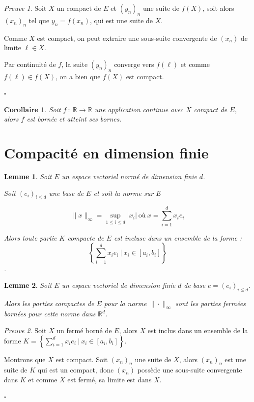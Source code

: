 \documentclass[]{article}
\newtheorem{mylemma}{Lemme}
\newtheorem{mycor}{Corollaire}
\theoremstyle{remark}
\newtheorem{myproof}{Preuve}
\theoremstyle{definition}
\newcommand{\cqfd}{
	\hfill$\square$
}
\newcommand{\funcshort}[3]{
#1 ~ : ~ #2 \longrightarrow #3
}
\begin{document}
\begin{myproof}
	Soit $X$ un compact de $E$ et $(y_n)_n$ une suite de $f(X)$, soit alors $(x_n)_n$ tel que $y_n=f(x_n)$, qui est une suite de $X$.
	
	Comme $X$ est compact, on peut extraire une sous-suite convergente de $(x_n)$ de limite $\ell \in X$.
	
	Par continuité de $f$, la suite $(y_n)_n$ converge vers $f(\ell)$ et comme $f(\ell) \in f(X)$, on a bien que $f(X)$ est compact.
	
	
	\cqfd
\end{myproof}

\begin{mycor}
	Soit $\funcshort{f}{\mathbb{R}}{\mathbb{R}}$ une application continue avec $X$ compact de $E$, alors $f$ est bornée et atteint ses bornes.
\end{mycor}

\section{Compacité en dimension finie}

\begin{mylemma}
	Soit $E$ un espace vectoriel normé de dimension finie $d$.
	
	Soit $(e_i)_{i \leqslant d}$ une base de $E$ et soit la norme sur $E$
	
	$$\|x\|_{\infty} = \sup\limits_{1 \leqslant i \leqslant d} |x_i| ~ \text{où} ~ x = \sum_{i=1}^{d} x_i e_i$$
	
	Alors toute partie $K$ compacte de $E$ est incluse dans un ensemble de la forme : $$\left\{ \sum_{i =1}^{d} x_i e_i ~ | ~ x_i \in [a_i, b_i] \right\}$$.
\end{mylemma}

\begin{mylemma}
	Soit $E$ un espace vectoriel de dimension finie $d$ de base $e=(e_i)_{i \leqslant d}$.
	
	Alors les parties compactes de $E$ pour la norme $\|\cdot\|_{\infty}$ sont les parties fermées bornées pour cette norme dans $\mathbb{R}^d$.
\end{mylemma}

\begin{myproof}
	Soit $X$ un fermé borné de $E$, alors $X$ est inclus dans un ensemble de la forme $K = \left\{ \sum_{i =1}^{d} x_i e_i ~ | ~ x_i \in [a_i, b_i] \right\}$.
	
	Montrons que $X$ est compact.
	 Soit $(x_n)_n$ une suite de $X$, alors $(x_n)_n$ est une suite de $K$ qui est un compact, donc $(x_n)$ possède une sous-suite convergente dans $K$ et comme $X$ est fermé, sa limite est dans $X$.
	 
	 \cqfd
\end{myproof}
\end{document}
